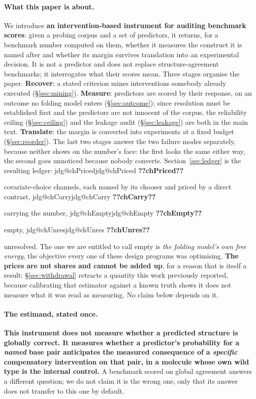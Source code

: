 \documentclass[11pt]{article}
\makeatletter
\newcommand{\jdg}[1]{%
  \ifcsname jdg@#1\endcsname\csname jdg@#1\endcsname
  \else\textbf{??#1??}\PackageError{nm}{undefined measured quantity #1}{}\fi}
\makeatother
\begin{document}
\paragraph{What this paper is about.} We introduce \textbf{an intervention-based instrument for
auditing benchmark scores}: given a probing corpus and a set of predictors, it returns, for a
benchmark number computed on them, whether it measures the construct it is named after and whether
its margin survives translation into an experimental decision. It is not a predictor and does not
replace structure-agreement benchmarks; it interrogates what their scores mean. Three stages
organise the paper. \textbf{Recover}: a stated criterion mines interventions somebody already
executed (\S\ref{sec:mining}). \textbf{Measure}: predictors are scored by their response, on an
outcome no folding model enters (\S\ref{sec:outcome}); since resolution must be established first
and the predictors are not innocent of the corpus, the reliability ceiling (\S\ref{sec:ceiling})
and the leakage audit (\S\ref{sec:leakage}) are both in the main text. \textbf{Translate}: the
margin is converted into experiments at a fixed budget (\S\ref{sec:reorder}). The last two stages
answer the two failure modes separately, because neither shows on the number's face: the first
looks the same either way, the second goes unnoticed because nobody converts.
Section~\ref{sec:ledger} is the resulting ledger: \jdg{chPriced} covariate-choice channels, each
named by its chooser and priced by a direct contrast, \jdg{chCarry} carrying the number,
\jdg{chEmpty} empty, \jdg{chUnres} unresolved. The one we are entitled to call empty is \emph{the
folding model's own free energy}, the objective every one of these design programs was optimising.
\textbf{The prices are not shares and cannot be added up}, for a reason that is itself a result:
\S\ref{sec:withdrawal} retracts a quantity this work previously reported, because calibrating that
estimator against a known truth shows it does not measure what it was read as measuring. No claim
below depends on it.

\paragraph{The estimand, stated once.} \textbf{This instrument does not measure whether a predicted
structure is globally correct. It measures whether a predictor's probability for a \emph{named}
base pair anticipates the measured consequence of a \emph{specific} compensatory intervention on
that pair, in a molecule whose own wild type is the internal control.} A benchmark scored on global
agreement answers a different question; we do not claim it is the wrong one, only that its answer
does not transfer to this one by default.
\end{document}
